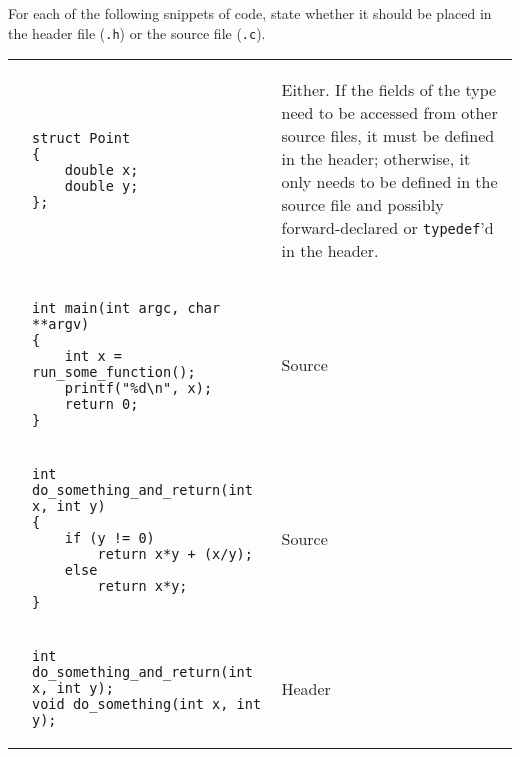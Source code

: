 For each of the following snippets of code, state whether it should be placed in the header file (\texttt{.h}) or the source file (\texttt{.c}).

\begin{enumerate}

\begin{tabular}{p{.25in}p{1.5in} p{4.5in}}
\item
&
{
\begin{lstlisting}[numbers=none]
struct Point
{
	double x;
	double y;
};
\end{lstlisting}
}
&
\begin{answer}
Either. If the fields of the type need to be accessed from other source files, it must be defined in the header; otherwise, it only needs to be defined in the source file and possibly forward-declared or \texttt{typedef}'d in the header.
\end{answer}
\\
\item
&
{
\begin{lstlisting}[numbers=none]
int main(int argc, char **argv)
{
	int x = run_some_function();
	printf("%d\n", x);
	return 0;
}
\end{lstlisting}
}
&
\begin{answer}
\hspace{2.5in}
Source
\end{answer}
\\
\item
&
{
\begin{lstlisting}[numbers=none]
int do_something_and_return(int x, int y)
{
	if (y != 0)
		return x*y + (x/y);
	else
		return x*y;
}
\end{lstlisting}
}
&
\begin{answer}
\hspace{2.5in}
Source
\end{answer}
\\
\item
&
{
\begin{lstlisting}[numbers=none]
int do_something_and_return(int x, int y);
void do_something(int x, int y);
\end{lstlisting}
}
&
\begin{answer}
\hspace{2.5in}
Header
\end{answer}
\\
\end{tabular}
\end{enumerate}
